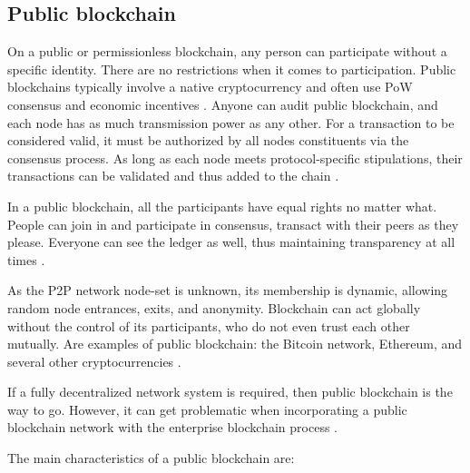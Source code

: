 \subsection{Public blockchain}\label{sec:blockchainPublica}
On a public or permissionless blockchain, any person can participate without a specific identity. There are no restrictions when it comes to participation. Public blockchains typically involve a native cryptocurrency and often use \acf{PoW} consensus and economic incentives \cite{androulaki2018hyperledger}. Anyone can audit public blockchain, and each node has as much transmission power as any other. For a transaction to be considered valid, it must be authorized by all nodes constituents via the consensus process. As long as each node meets protocol-specific stipulations, their transactions can be validated and thus added to the chain \cite{Comstor2018}.

In a public blockchain, all the participants have equal rights no matter what. People can join in and participate in consensus, transact with their peers as they please. Everyone can see the ledger as well, thus maintaining transparency at all times \cite{101blockchains}.

As the P2P network node-set is unknown, its membership is dynamic, allowing random node entrances, exits, and anonymity. Blockchain can act globally without the control of its participants, who do not even trust each other mutually. Are examples of public blockchain: the Bitcoin network, Ethereum, and several other cryptocurrencies \cite{bashir2018mastering, antonopoulos2017mastering}.

If a fully decentralized network system is required, then public blockchain is the way to go. However, it can get problematic when incorporating a public blockchain network with the enterprise blockchain process \cite{101blockchains}.

The main characteristics of a public blockchain are:

